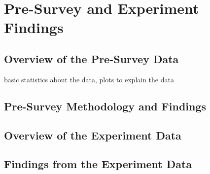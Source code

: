 
\chapter{Pre-Survey and Experiment Findings}


\section{Overview of the Pre-Survey Data}
basic statistics about the data, plots to explain the data

\section{Pre-Survey Methodology and Findings}

\section{Overview of the Experiment Data}

\section{Findings from the Experiment Data}



